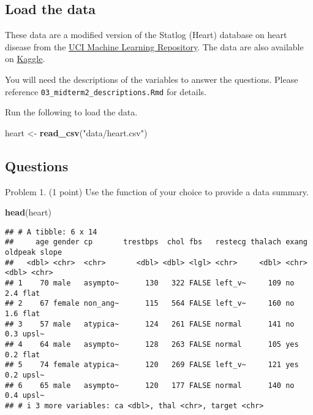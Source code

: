 \documentclass[
]{article}
\newenvironment{Shaded}{\begin{snugshade}}{\end{snugshade}}
\newcommand{\FunctionTok}[1]{\textcolor[rgb]{0.13,0.29,0.53}{\textbf{#1}}}
\newcommand{\NormalTok}[1]{#1}
\newcommand{\OtherTok}[1]{\textcolor[rgb]{0.56,0.35,0.01}{#1}}
\newcommand{\StringTok}[1]{\textcolor[rgb]{0.31,0.60,0.02}{#1}}
\begin{document}
\subsection{Load the data}\label{load-the-data}

These data are a modified version of the Statlog (Heart) database on
heart disease from the
\href{https://archive.ics.uci.edu/dataset/145/statlog+heart}{UCI Machine
Learning Repository}. The data are also available on
\href{https://www.kaggle.com/datasets/ritwikb3/heart-disease-statlog/data}{Kaggle}.

You will need the descriptions of the variables to answer the questions.
Please reference \texttt{03\_midterm2\_descriptions.Rmd} for details.

Run the following to load the data.

\begin{Shaded}
\begin{Highlighting}[]
\NormalTok{heart }\OtherTok{\textless{}{-}} \FunctionTok{read\_csv}\NormalTok{(}\StringTok{"data/heart.csv"}\NormalTok{)}
\end{Highlighting}
\end{Shaded}

\subsection{Questions}\label{questions}

Problem 1. (1 point) Use the function of your choice to provide a data
summary.

\begin{Shaded}
\begin{Highlighting}[]
\FunctionTok{head}\NormalTok{(heart)}
\end{Highlighting}
\end{Shaded}

\begin{verbatim}
## # A tibble: 6 x 14
##     age gender cp       trestbps  chol fbs   restecg thalach exang oldpeak slope
##   <dbl> <chr>  <chr>       <dbl> <dbl> <lgl> <chr>     <dbl> <chr>   <dbl> <chr>
## 1    70 male   asympto~      130   322 FALSE left_v~     109 no        2.4 flat 
## 2    67 female non_ang~      115   564 FALSE left_v~     160 no        1.6 flat 
## 3    57 male   atypica~      124   261 FALSE normal      141 no        0.3 upsl~
## 4    64 male   asympto~      128   263 FALSE normal      105 yes       0.2 flat 
## 5    74 female atypica~      120   269 FALSE left_v~     121 yes       0.2 upsl~
## 6    65 male   asympto~      120   177 FALSE normal      140 no        0.4 upsl~
## # i 3 more variables: ca <dbl>, thal <chr>, target <chr>
\end{verbatim}
\end{document}
